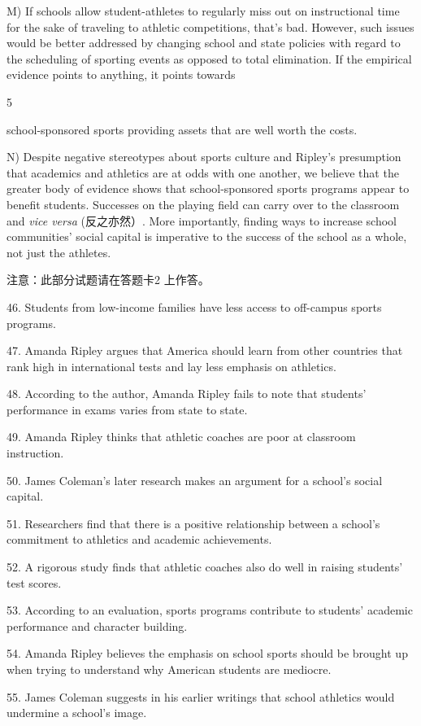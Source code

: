 \documentclass[UTF8,11pt]{ctexart}
\begin{document}
M) If schools allow student-athletes to regularly miss out on instructional time for the sake of traveling to athletic competitions, that’s bad. However, such issues would be better addressed by changing school and state policies with regard to the scheduling of sporting events as opposed to total elimination. If the empirical evidence points to anything, it points towards


5


school-sponsored sports providing assets that are well worth the costs.


N) Despite negative stereotypes about sports culture and Ripley’s presumption that academics and athletics are at odds with one another, we believe that the greater body of evidence shows that school-sponsored sports programs appear to benefit students. Successes on the playing field can carry over to the classroom and\textit{ vice versa} (反之亦然）. More importantly, finding ways to increase school communities’ social capital is imperative to the success of the school as a whole, not just the athletes.


注意：此部分试题请在答题卡2 上作答。


46. Students from low-income families have less access to off-campus sports programs.


47. Amanda Ripley argues that America should learn from other countries that rank high in international tests and lay less emphasis on athletics.


48. According to the author, Amanda Ripley fails to note that students’ performance in exams varies from state to state.


49. Amanda Ripley thinks that athletic coaches are poor at classroom instruction.


50. James Coleman’s later research makes an argument for a school’s social capital.


51. Researchers find that there is a positive relationship between a school’s commitment to athletics and academic achievements.


52. A rigorous study finds that athletic coaches also do well in raising students’ test scores.


53. According to an evaluation, sports programs contribute to students’ academic performance and character building.


54. Amanda Ripley believes the emphasis on school sports should be brought up when trying to understand why American students are mediocre.


55. James Coleman suggests in his earlier writings that school athletics would undermine a school’s image.
\end{document}
